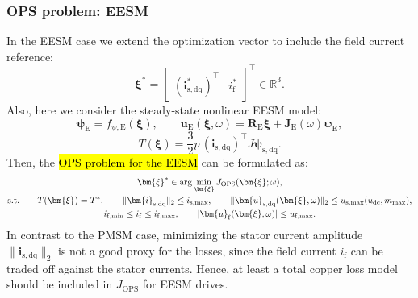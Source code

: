 \begin{frame}
    \frametitle{OPS problem: EESM}
    In the EESM case we extend the optimization vector to include the field current reference:
    \[
        \bm{\xi}^*=
        \begin{bmatrix}
            (\bm{i}_{\mathrm{s,dq}}^*)^\top & i_{\mathrm{f}}^*
        \end{bmatrix}^{\!\top}
        \in \mathbb{R}^3 .
    \]\pause%
    Also, here we consider the steady-state nonlinear EESM model:
    \begin{equation*}
        \bm{\psi}_{\mathrm E}=f_{\psi,\mathrm E}(\bm{\xi}),
        \qquad
        \bm{u}_{\mathrm E}(\bm{\xi},\omega)
        =
        \bm{R}_{\mathrm E}\bm{\xi}+\bm{J}_{\mathrm E}(\omega)\bm{\psi}_{\mathrm E},
    \end{equation*}
    \begin{equation*}
        T(\bm{\xi})
        =
        \frac{3}{2}p\,
        (\bm{i}_{\mathrm{s,dq}})^{\top} J \bm{\psi}_{\mathrm{s,dq}} .
    \end{equation*}\pause%
    Then, the \hl{OPS problem for the EESM} can be formulated as:
    \begin{gather}
        \bm{\xi}^*
        \in
        \arg\min_{\bm{\xi}}
        J_{\mathrm{OPS}}(\bm{\xi};\omega),
        \\[-0.5mm]
        \text{s.t.}\qquad
        T(\bm{\xi})=T^*,
        \qquad
        \|\bm{i}_{\mathrm{s,dq}}\|_2\le i_{\mathrm{s},\max},
        \qquad
        \|\bm{u}_{\mathrm{s,dq}}(\bm{\xi},\omega)\|_2
        \le
        u_{\mathrm{s},\max}(u_{\mathrm{dc}},m_{\max}),\notag
        \\[-0.5mm]
        i_{\mathrm f,\min}\le i_{\mathrm f}\le i_{\mathrm f,\max},
        \qquad
        |\bm{u}_{\mathrm f}(\bm{\xi},\omega)|\le u_{\mathrm f,\max}.\notag
    \end{gather}\pause%
    In contrast to the PMSM case, minimizing the stator current amplitude $\|\bm{i}_{\mathrm{s,dq}}\|_2$ is not a good proxy for the losses, since the field current $i_{\mathrm f}$ can be traded off against the stator currents. Hence, at least a total copper loss model should be included in $J_{\mathrm{OPS}}$ for EESM drives.
\end{frame}

